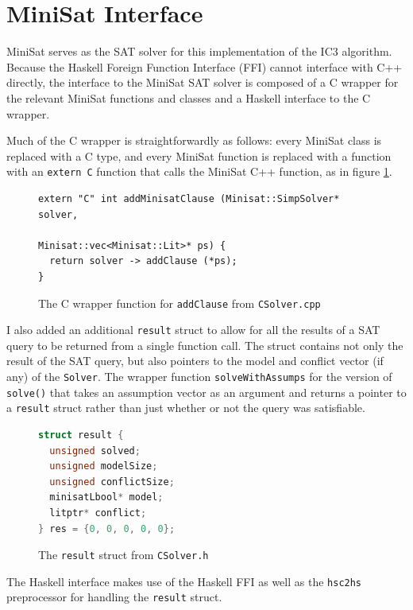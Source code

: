 \documentclass[12pt,a4paper,twoside,openright]{report}
\begin{document}
{\section{MiniSat Interface}

MiniSat serves as the SAT solver for this implementation of the IC3 algorithm.
Because the Haskell Foreign Function Interface (FFI) cannot interface with C++ directly,
the interface to the MiniSat SAT solver is composed of a C wrapper for the relevant
MiniSat functions and classes and a Haskell interface to the C wrapper.

Much of the C wrapper is straightforwardly as follows: every MiniSat class is replaced with a C
type, and every MiniSat function is replaced with a function with an \verb,extern C, function that
calls the MiniSat C++ function, as in figure \ref{addClause}.

\begin{figure}[ht]
\begin{verbatim}
extern "C" int addMinisatClause (Minisat::SimpSolver* solver,
                                 Minisat::vec<Minisat::Lit>* ps) {
  return solver -> addClause (*ps);
}
\end{verbatim}
\caption{The C wrapper function for {\tt addClause} from {\tt CSolver.cpp}}
\label{addClause}
\end{figure}

I also added an additional \verb,result, struct to allow for all the results of a SAT query to
be returned from a single function call. The struct contains not only the result of the SAT
query, but also pointers to the model and conflict vector (if any) of the \verb,Solver,.
The wrapper function \verb,solveWithAssumps, for the version of \verb,solve(), that takes an assumption
vector as an argument and returns a pointer to a \verb,result, struct
rather than just whether or not the query was satisfiable.

\begin{figure}[ht]
\begin{lstlisting}[language=C]
struct result {
  unsigned solved;
  unsigned modelSize;
  unsigned conflictSize;
  minisatLbool* model;
  litptr* conflict;
} res = {0, 0, 0, 0, 0};
\end{lstlisting}
\caption{The {\tt result} struct from {\tt CSolver.h}}
\end{figure}

The Haskell interface makes use of the Haskell FFI as well as the \verb,hsc2hs, preprocessor
for handling the \verb,result, struct.

}
\end{document}
